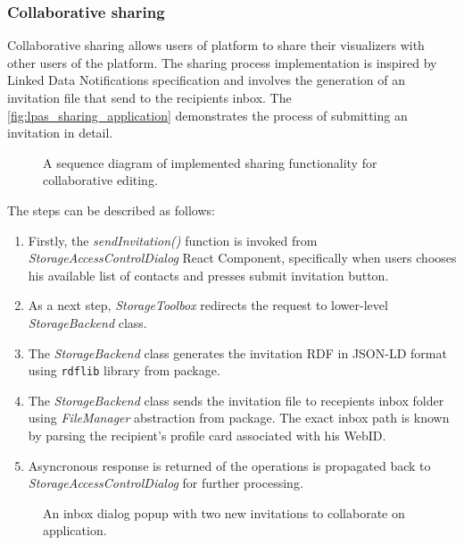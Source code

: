 \subsubsection{Collaborative sharing}
\label{ssssec:collaborative_sharing}

Collaborative sharing allows users of \lpa{} platform to share their visualizers with other users of the platform. The sharing process implementation is inspired by Linked Data Notifications specification  and involves the generation of an invitation file that send to the recipients inbox. The \autoref{fig:lpas_sharing_application} demonstrates the process of submitting an invitation in detail.

\begin{figure}[h]
\centering
{}
\caption{A sequence diagram of implemented sharing functionality for collaborative editing.}
\label{fig:lpas_sharing_application}
\end{figure}
  
The steps can be described as follows:
\begin{enumerate}
    \item Firstly, the \textit{sendInvitation()} function is invoked from \textit{StorageAccessControlDialog} React Component, specifically when users chooses his available list of contacts and presses submit invitation button.
    \item As a next step, \textit{StorageToolbox} redirects the request to lower-level \textit{StorageBackend} class.
    \item The \textit{StorageBackend} class generates the invitation RDF in JSON-LD format using \texttt{rdflib} library from \lpas{} package.
    \item The \textit{StorageBackend} class sends the invitation file to recepients inbox folder using \textit{FileManager} abstraction from \lpas{} package. The exact inbox path is known by parsing the recipient's profile card associated with his WebID.
    \item Asyncronous response is returned of the operations is propagated back to \textit{StorageAccessControlDialog} for further processing. 
\end{enumerate}
 
\begin{figure}[h]
\centering
{}
\caption{An inbox dialog popup with two new invitations to collaborate on application.}
\label{fig:lpa_inbox_with_invitations}
\end{figure}
  
